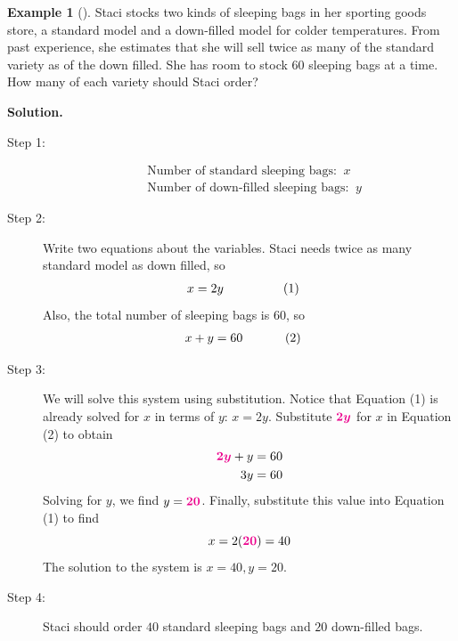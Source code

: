 \documentclass[10pt,]{book}
\theoremstyle{plain}
\theoremstyle{definition}
\theoremstyle{definition}
\newtheorem{example}[theorem]{Example}
\theoremstyle{definition}
\numberwithin{equation}{part}
\newcommand{\alert}[1]{\boldsymbol{\color{magenta}{#1}}}
\newcommand{\amp}{&}
\begin{document}
\begin{example}[]\label{example-30}
Staci stocks two kinds of sleeping bags in her sporting goods store, a standard model and a down-filled model for colder temperatures. From past experience, she estimates that she will sell twice as many of the standard variety as of the down filled. She has room to stock 60 sleeping bags at a time. How many of each variety should Staci order?%
\par\medskip\noindent%
\textbf{Solution.}\quad \leavevmode%
\begin{description}
\item[{Step 1:}]\hypertarget{li-177}{}%
\begin{align*}
\amp\text{Number of standard sleeping bags: }~x\\
\amp\text{Number of down-filled sleeping bags: }~y
\end{align*}
%
\item[{Step 2:}]\hypertarget{li-178}{}Write two equations about the variables. Staci needs twice as many standard model as down filled, so%
\begin{align*}
x \amp = 2y\amp\amp\hphantom{blankety}(1)
\end{align*}
Also, the total number of sleeping bags is 60, so%
\begin{align*}
x+y \amp = 60\amp\amp\hphantom{blank}(2)
\end{align*}
%
\item[{Step 3:}]\hypertarget{li-179}{}We will solve this system using substitution. Notice that Equation (1) is already solved for \(x\) in terms of \(y\): \(x = 2y\). Substitute \(\alert{2y}\) for \(x\) in Equation (2) to obtain%
\begin{align*}
\alert{2y} + y \amp = 60
\\
3y\amp = 60
\end{align*}
Solving for \(y\), we find \(y=\alert{20}\). Finally, substitute this value into Equation (1) to find%
\begin{equation*}
x = 2(\alert{20}) = 40
\end{equation*}
The solution to the system is \(x = 40, y = 20\).%
\item[{Step 4:}]\hypertarget{li-180}{}Staci should order \(40\) standard sleeping bags and \(20\) down-filled bags.%
\end{description}
%
\end{example}
\typeout{************************************************}
\typeout{************************************************}
\end{document}
